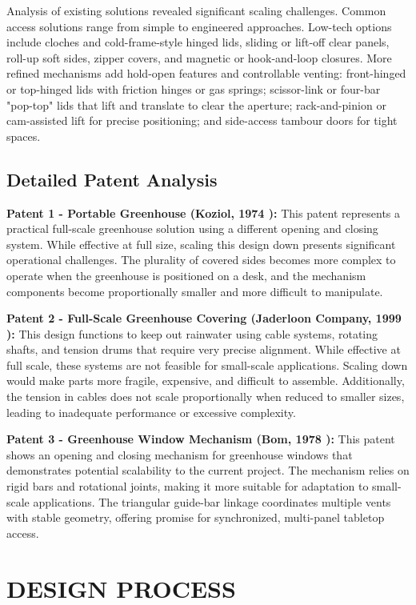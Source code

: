 \documentclass[12pt]{article}
\begin{document}
Analysis of existing solutions revealed significant scaling challenges. Common access solutions range from simple to engineered approaches. Low-tech options include cloches and cold-frame-style hinged lids, sliding or lift-off clear panels, roll-up soft sides, zipper covers, and magnetic or hook-and-loop closures. More refined mechanisms add hold-open features and controllable venting: front-hinged or top-hinged lids with friction hinges or gas springs; scissor-link or four-bar "pop-top" lids that lift and translate to clear the aperture; rack-and-pinion or cam-assisted lift for precise positioning; and side-access tambour doors for tight spaces.

\subsection*{Detailed Patent Analysis}

\textbf{Patent 1 - Portable Greenhouse (Koziol, 1974 \cite{Koziol1974}):} This patent represents a practical full-scale greenhouse solution using a different opening and closing system. While effective at full size, scaling this design down presents significant operational challenges. The plurality of covered sides becomes more complex to operate when the greenhouse is positioned on a desk, and the mechanism components become proportionally smaller and more difficult to manipulate.

\textbf{Patent 2 - Full-Scale Greenhouse Covering (Jaderloon Company, 1999 \cite{Jaderloon1999}):} This design functions to keep out rainwater using cable systems, rotating shafts, and tension drums that require very precise alignment. While effective at full scale, these systems are not feasible for small-scale applications. Scaling down would make parts more fragile, expensive, and difficult to assemble. Additionally, the tension in cables does not scale proportionally when reduced to smaller sizes, leading to inadequate performance or excessive complexity.

\textbf{Patent 3 - Greenhouse Window Mechanism (Bom, 1978 \cite{Bom1978}):} This patent shows an opening and closing mechanism for greenhouse windows that demonstrates potential scalability to the current project. The mechanism relies on rigid bars and rotational joints, making it more suitable for adaptation to small-scale applications. The triangular guide-bar linkage coordinates multiple vents with stable geometry, offering promise for synchronized, multi-panel tabletop access.

\section*{DESIGN PROCESS}
\end{document}
